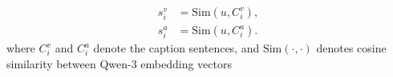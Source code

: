 \begin{equation}
\label{eq:modality_sims}
\begin{aligned}
s^v_i &= \mathrm{Sim}(u, C^v_i), \\
s^a_i &= \mathrm{Sim}(u, C^a_i).
\end{aligned}
\end{equation}
\noindent where $C^v_i$ and $C^a_i$ denote the caption sentences, and $\mathrm{Sim}(\cdot,\cdot)$ denotes cosine similarity between Qwen-3 embedding vectors